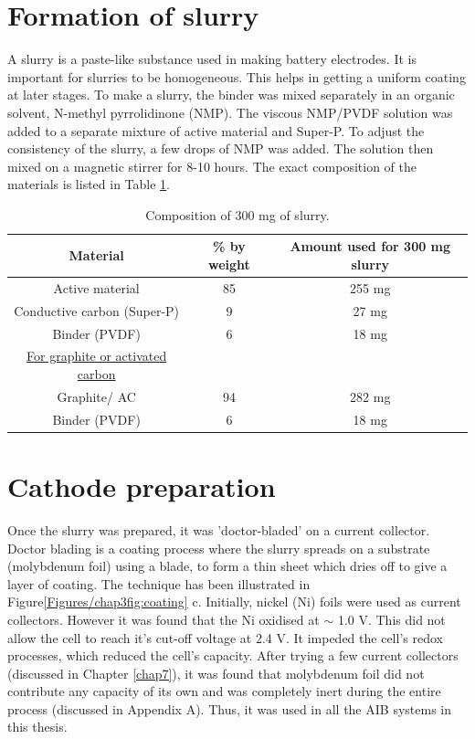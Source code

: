 \section{Formation of slurry} \label{slurry}
A slurry is a paste-like substance used in making battery electrodes. It is important for slurries to be homogeneous. This helps in getting a uniform coating at later stages. To make a slurry, the binder was mixed separately in an organic solvent, N-methyl pyrrolidinone (NMP). The viscous NMP/PVDF solution was added to a separate mixture of active material and Super-P. To adjust the consistency of the slurry, a few drops of NMP was added. The solution then mixed on a magnetic stirrer for 8-10 hours. The exact composition of the materials is listed in Table \ref{tabcom}. 
\begin{table}[tbh!]
\centering
\caption{Composition of 300 mg of slurry.} \label{tabcom}
\begin{tabular}{|ccc|} 
\hline 
\textbf{Material} & \textbf{\% by weight} & \textbf{Amount used for 300 mg slurry} \\ 
\hline
Active material & 85 & 255 mg \\
Conductive carbon (Super-P) & 9 & 27 mg \\ 
Binder (PVDF) & 6 & 18 mg \\ 
\underline{For graphite or activated carbon} & &\\
Graphite/ AC & 94 & 282 mg \\
Binder (PVDF) & 6 & 18 mg \\ 
\hline
\end{tabular}
\end{table}

\section{Cathode preparation} \label{catprep}
Once the slurry was prepared, it was 'doctor-bladed' on a current collector. Doctor blading is a coating process where the slurry spreads on a substrate (molybdenum foil)  using a blade, to form a thin sheet which dries off to give a layer of coating. The technique has been illustrated in Figure\ref{Figures/chap3fig:coating} c. Initially, nickel (Ni) foils were used as current collectors. However it was found that the Ni oxidised at $\sim$ 1.0 V. This did not allow the cell to reach it's cut-off voltage at 2.4 V. It impeded the cell's redox processes, which reduced the cell's capacity. After trying a few current collectors (discussed in Chapter \ref{chap7}), it was found that molybdenum foil did not contribute any capacity of its own and was completely inert during the entire process (discussed in Appendix A). Thus, it was used in all the AIB systems in this thesis. %

